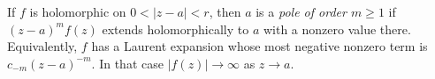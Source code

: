 
If $f$ is holomorphic on $0<|z-a|<r$, then $a$ is a \emph{pole of order $m\ge1$} if $(z-a)^m f(z)$ extends holomorphically to $a$ with a nonzero value there. Equivalently, $f$ has a Laurent expansion whose most negative nonzero term is $c_{-m}(z-a)^{-m}$. In that case $|f(z)|\to\infty$ as $z\to a$.
